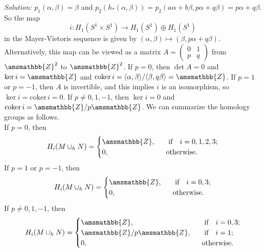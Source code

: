 \documentclass[a4paper, 12pt]{article}
\newenvironment{solution}
    {\textit{Solution:}}
    {}
\newcommand{\la}{\langle}
\newcommand{\ra}{\rangle}
\renewcommand{\mathbb}{\amsmathbb}
\newcommand{\iif}{\ \ \ \text{if}\ \ \ }
\newcommand{\otherwise}{\text{otherwise}}
\newcommand{\coker}{\text{coker}\,}
\begin{document}
\begin{solution}
\(p_1(\alpha,\beta)=\beta\) and \(p_2(h_*(\alpha,\beta))=p_2(a\alpha+b\beta,p\alpha+q\beta)=p\alpha+q\beta\). So the map 
\[i:H_1(S^1\times S^1)\rightarrow H_1(S^1)\oplus H_1(S^1)\]
in the Mayer-Vietoris sequence is given by \((\alpha,\beta)\mapsto (\beta,p\alpha+q\beta)\). Alternatively,  this map can be viewed as a matrix \(A=\begin{pmatrix}
    0&1\\ 
    p&q
\end{pmatrix}\) from \(\mathbb{Z}^2\) to \(\mathbb{Z}^2\). If \(p=0\), then \(\det A=0\) and \(\ker i=\mathbb{Z}\) and \(\coker i=\la \alpha,\beta\ra/\la \beta,q\beta\ra=\mathbb{Z}\). If 
\(p=1\) or \(p=-1\), then \(A\) is invertible, and this implies \(i\) is an isomorphism, so \(\ker i=\coker i=0\). If \(p\neq 0,1,-1\), then \(\ker i=0\) and \(\coker i=\mathbb{Z}/ p \mathbb{Z}\). 
We can summarize the homology groups as follows.\\ 
If \(p=0\), then 
\[H_i(M\cup_h N)=\begin{cases}
    \mathbb{Z},&\iif i=0,1,2,3;\\ 
    0,&\ \ \otherwise.
\end{cases}\]
If \(p=1\) or \(p=-1\), then 
\[H_i(M\cup_h N)=\begin{cases}
    \mathbb{Z},&\iif i=0,3;\\ 
    0,&\ \ \otherwise.
\end{cases}\]
If \(p\neq 0,1,-1\), then 
\[H_i(M\cup_h N)=\begin{cases}
    \mathbb{Z},&\iif i=0,3;\\ 
    \mathbb{Z}/p \mathbb{Z},&\iif i=1;\\ 
    0,&\ \ \otherwise.
\end{cases}\]
\end{solution}
\end{document}
